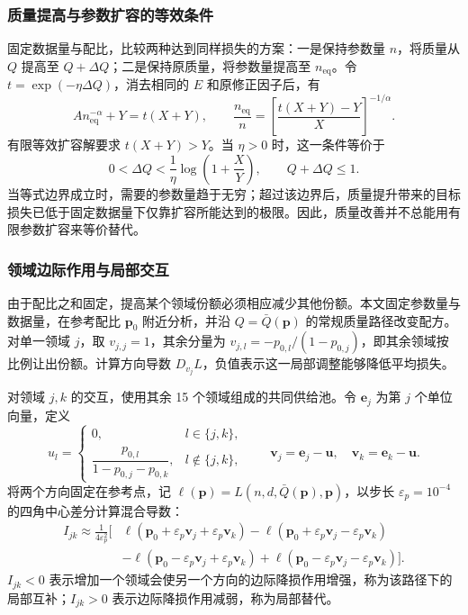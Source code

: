 \documentclass[bwprint]{gmcmthesis}
\numberwithin{equation}{section}
\numberwithin{figure}{section}
\numberwithin{table}{section}
\begin{document}
        \subsubsection{质量提高与参数扩容的等效条件}  %
        固定数据量与配比，比较两种达到同样损失的方案：一是保持参数量 $n$，将质量从 $Q$ 提高至 $Q+\Delta Q$；二是保持原质量，将参数量提高至 $n_{\mathrm{eq}}$。令 $t=\exp(-\eta\Delta Q)$，消去相同的 $E$ 和原修正因子后，有
        \begin{equation}
         A n_{\mathrm{eq}}^{-\alpha}+Y=t(X+Y),\qquad
         \frac{n_{\mathrm{eq}}}{n}=\left[\frac{t(X+Y)-Y}{X}\right]^{-1/\alpha}.
         \label{eq:p2_equiv}
        \end{equation}
        有限等效扩容解要求 $t(X+Y)>Y$。当 $\eta>0$ 时，这一条件等价于
        \begin{equation}
         0<\Delta Q<\frac1\eta\log\left(1+\frac XY\right),\qquad Q+\Delta Q\leq1.
         \label{eq:p2_equiv_bound}
        \end{equation}
        当等式边界成立时，需要的参数量趋于无穷；超过该边界后，质量提升带来的目标损失已低于固定数据量下仅靠扩容所能达到的极限。因此，质量改善并不总能用有限参数扩容来等价替代。
    
        \subsubsection{领域边际作用与局部交互}  %
        由于配比之和固定，提高某个领域份额必须相应减少其他份额。本文固定参数量与数据量，在参考配比 $\bm p_0$ 附近分析，并沿 $Q=\bar Q(\bm p)$ 的常规质量路径改变配方。对单一领域 $j$，取 $v_{j,j}=1$，其余分量为 $v_{j,l}=-p_{0,l}/(1-p_{0,j})$，即其余领域按比例让出份额。计算方向导数 $D_{v_j}L$，负值表示这一局部调整能够降低平均损失。
        
        对领域 $j,k$ 的交互，使用其余 15 个领域组成的共同供给池。令 $\bm e_j$ 为第 $j$ 个单位向量，定义
        \begin{equation}
         u_l=\begin{cases}0,&l\in\{j,k\},\\
         \dfrac{p_{0,l}}{1-p_{0,j}-p_{0,k}},&l\notin\{j,k\},\end{cases}
         \qquad \bm v_j=\bm e_j-\bm u,\quad \bm v_k=\bm e_k-\bm u.
         \label{eq:p2_pool}
        \end{equation}
        将两个方向固定在参考点，记 $\ell(\bm p)=L(n,d,\bar Q(\bm p),\bm p)$，以步长 $\varepsilon_p=10^{-4}$ 的四角中心差分计算混合导数：
        \begin{equation}
         \begin{aligned}
         I_{jk}\approx\frac1{4\varepsilon_p^2}\big[&\ell(\bm p_0+\varepsilon_p\bm v_j+\varepsilon_p\bm v_k)
         -\ell(\bm p_0+\varepsilon_p\bm v_j-\varepsilon_p\bm v_k)\\
         &-\ell(\bm p_0-\varepsilon_p\bm v_j+\varepsilon_p\bm v_k)
         +\ell(\bm p_0-\varepsilon_p\bm v_j-\varepsilon_p\bm v_k)\big].
         \end{aligned}
         \label{eq:p2_interaction}
        \end{equation}
        $I_{jk}<0$ 表示增加一个领域会使另一个方向的边际降损作用增强，称为该路径下的局部互补；$I_{jk}>0$ 表示边际降损作用减弱，称为局部替代。
\end{document}
